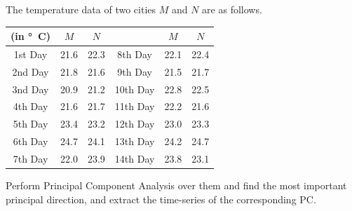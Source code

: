 \begin{exmp}
\label{exmp:tempPCA}
The temperature data of two cities $M$ and $N$ are as follows.
\begin{center}
\begin{tabular}{|c|c|c|c|c|c|}
\hline
(in \si{\degree C}) & $M$ & $N$ & & $M$ & $N$ \\
\hline
1st Day & 21.6 & 22.3 & 8th Day & 22.1 & 22.4 \\
\hline
2nd Day & 21.8 & 21.6 & 9th Day & 21.5 & 21.7 \\
\hline
3nd Day & 20.9 & 21.2 & 10th Day & 22.8 & 22.5 \\
\hline
4th Day & 21.6 & 21.7 & 11th Day & 22.2 & 21.6 \\
\hline
5th Day & 23.4 & 23.2 & 12th Day & 23.0 & 23.3 \\
\hline 
6th Day & 24.7 & 24.1 & 13th Day & 24.2 & 24.7 \\
\hline 
7th Day & 22.0 & 23.9 & 14th Day & 23.8 & 23.1 \\
\hline
\end{tabular}
\end{center}
Perform Principal Component Analysis over them and find the most important principal direction, and extract the time-series of the corresponding PC.
\end{exmp}
